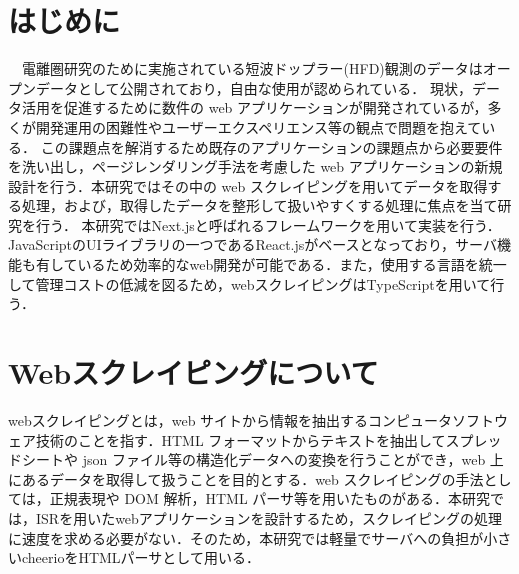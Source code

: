 \section{はじめに}
　電離圏研究のために実施されている短波ドップラー(HFD)観測のデータはオープンデータとして公開されており，自由な使用が認められている．
現状，データ活用を促進するために数件の web アプリケーションが開発されているが，多くが開発運用の困難性やユーザーエクスペリエンス等の観点で問題を抱えている．
 この課題点を解消するため既存のアプリケーションの課題点から必要要件を洗い出し，ページレンダリング手法を考慮した web アプリケーションの新規設計を行う．本研究ではその中の web スクレイピングを用いてデータを取得する処理，および，取得したデータを整形して扱いやすくする処理に焦点を当て研究を行う．
本研究ではNext.jsと呼ばれるフレームワークを用いて実装を行う．JavaScriptのUIライブラリの一つであるReact.jsがベースとなっており，サーバ機能も有しているため効率的なweb開発が可能である．また，使用する言語を統一して管理コストの低減を図るため，webスクレイピングはTypeScriptを用いて行う．

\section{Webスクレイピングについて}
webスクレイピングとは，web サイトから情報を抽出するコンピュータソフトウェア技術のことを指す．HTML フォーマットからテキストを抽出してスプレッドシートや json ファイル等の構造化データへの変換を行うことができ，web 上にあるデータを取得して扱うことを目的とする．web スクレイピングの手法としては，正規表現や DOM 解析，HTML パーサ等を用いたものがある．本研究では，ISRを用いたwebアプリケーションを設計するため，スクレイピングの処理に速度を求める必要がない．そのため，本研究では軽量でサーバへの負担が小さいcheerioをHTMLパーサとして用いる．
